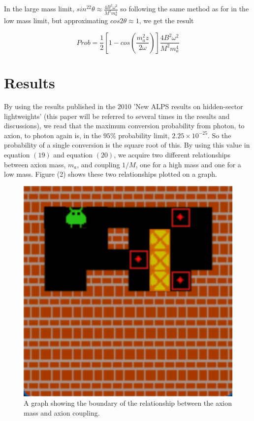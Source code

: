 \documentclass[12pt]{article}
\begin{document}
In the large mass limit, $sin^22\theta \approx \frac{4B^2\omega^2}{M^2m_a^4}$ so following the same method as for in the low mass limit, but approximating $cos2\theta \approx 1$, we get the result

\begin{equation} Prob = \frac{1}{2} \left[ 1- cos\left(\frac{m_a^2z}{2\omega} \right) \right] \frac{4B^2\omega^2}{M^2m_a^4}
\end{equation}

\section{Results}
\label{sec:results}

By using the results published in the 2010 'New ALPS results on hidden-sector lightweights' (this paper will be referred to several times in the results and discussions), we read that the maximum conversion probability from photon, to axion, to photon again is, in the $95\%$ probability limit, $2.25\times10^{-25}$. So the probability of a single conversion is the square root of this. By using this value in equation $(19)$ and equation $(20)$, we acquire two different relationships between axion mass, $m_a$, and coupling $1/M$, one for a high mass and one for a low mass. Figure (2) shows these two relationships plotted on a graph. 
\begin{figure}[h]
\centering
\includegraphics[width=1\textwidth]{Images/sokoban_cas_2.png}
\caption{\label{Graph.jpg} A graph showing the boundary of the relationship between the axion mass and axion coupling.}
\end{figure}
\end{document}
